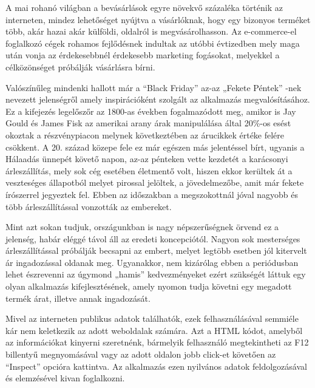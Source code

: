 A mai rohanó világban a bevásárlások egyre növekvő százaléka történik az interneten, mindez lehetőséget nyújtva a vásárlóknak, hogy egy bizonyos terméket több, akár hazai akár külföldi, oldalról is megvásárolhasson. Az e-commerce-el foglalkozó cégek rohamos fejlődésnek indultak az utóbbi évtizedben mely maga után vonja az érdekesebbnél érdekesebb marketing fogásokat, melyekkel a célközönséget próbálják vásárlásra bírni.

Valószínűleg mindenki hallott már a “Black Friday” az-az „Fekete Péntek” -nek nevezett jelenségről amely inspirációként szolgált az alkalmazás megvalósításához. Ez a kifejezés legelőszőr az 1800-as években fogalmazódott meg, amikor is Jay Gould és James Fisk az amerikai arany árak manipulálása által 20\%-os esést okoztak a részvénypiacon melynek következtében az árucikkek értéke felére csökkent. A 20. század közepe fele ez már egészen más jelentéssel bírt, ugyanis a Hálaadás ünnepét követő napon, az-az pénteken vette kezdetét a karácsonyi árleszállítás, mely sok cég esetében életmentő volt, hiszen ekkor kerültek át a veszteséges állapotból melyet pirossal jelöltek, a jövedelmezőbe, amit már fekete írószerrel jegyeztek fel. Ebben az időszakban a megszokottnál jóval nagyobb és több árleszállítással vonzották az embereket.

Mint azt sokan tudjuk, országunkban is nagy népszerűségnek örvend ez a jelenség, habár eléggé távol áll az eredeti koncepciótól. Nagyon sok mesterséges árleszállítással próbálják becsapni az embert, melyet legtöbb esetben jól kitervelt ár ingadozással oldanak meg. Ugyanakkor, nem kizárólag ebben a periódusban lehet észrevenni az úgymond „hamis” kedvezményeket ezért szükségét láttuk egy olyan alkalmazás kifejlesztésének, amely nyomon tudja követni egy megadott termék árat, illetve annak ingadozását.

Mivel az interneten publikus adatok találhatók, ezek felhasználásával semmiéle kár nem keletkezik az adott weboldalak számára. Azt a HTML kódot, amelyből az információkat kinyerni szeretnénk, bármelyik felhasználó megtekintheti az F12 billentyű megnyomásával vagy az adott oldalon jobb click-et követően az “Inspect” opcióra kattintva. Az alkalmazás ezen nyilvános adatok feldolgozásával és elemzésével kivan foglalkozni.
